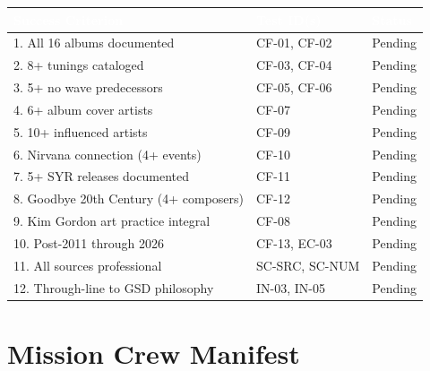 \documentclass[11pt,letterpaper]{article}
\newcommand{\tableheader}[1]{\textbf{\sffamily\textcolor{white}{#1}}}
\begin{document}
\begin{center}
\begin{tabularx}{\textwidth}{XL{3cm}C{1.5cm}}
\toprule
{}
\tableheader{Success Criterion} & \tableheader{Test ID(s)} & \tableheader{Status} \\
. All 16 albums documented & CF-01, CF-02 & Pending \\
2. 8+ tunings cataloged & CF-03, CF-04 & Pending \\
3. 5+ no wave predecessors & CF-05, CF-06 & Pending \\
4. 6+ album cover artists & CF-07 & Pending \\
5. 10+ influenced artists & CF-09 & Pending \\
6. Nirvana connection (4+ events) & CF-10 & Pending \\
7. 5+ SYR releases documented & CF-11 & Pending \\
8. Goodbye 20th Century (4+ composers) & CF-12 & Pending \\
9. Kim Gordon art practice integral & CF-08 & Pending \\
10. Post-2011 through 2026 & CF-13, EC-03 & Pending \\
11. All sources professional & SC-SRC, SC-NUM & Pending \\
12. Through-line to GSD philosophy & IN-03, IN-05 & Pending \\
\bottomrule
\end{tabularx}
\end{center}

\section{Mission Crew Manifest}
\end{document}
